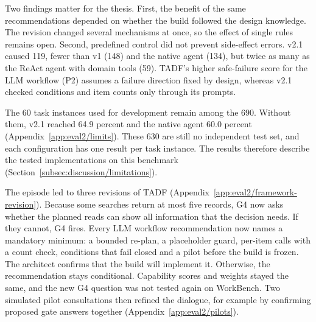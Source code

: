 Two findings matter for the thesis. First, the benefit of the same recommendations depended on whether the build followed the design knowledge. The revision changed several mechanisms at once, so the effect of single rules remains open. Second, predefined control did not prevent side-effect errors. v2.1 caused 119, fewer than v1 (148) and the native agent (134), but twice as many as the ReAct agent with domain tools (59). TADF's higher safe-failure score for the LLM workflow (P2) assumes a failure direction fixed by design, whereas v2.1 checked conditions and item counts only through its prompts.

The 60 task instances used for development remain among the 690. Without them, v2.1 reached 64.9 percent and the native agent 60.0 percent (Appendix~\ref{app:eval2/limits}). These 630 are still no independent test set, and each configuration has one result per task instance. The results therefore describe the tested implementations on this benchmark (Section~\ref{subsec:discussion/limitations}).

The episode led to three revisions of TADF (Appendix~\ref{app:eval2/framework-revision}). Because some searches return at most five records, G4 now asks whether the planned reads can show all information that the decision needs. If they cannot, G4 fires. Every LLM workflow recommendation now names a mandatory minimum: a bounded re-plan, a placeholder guard, per-item calls with a count check, conditions that fail closed and a pilot before the build is frozen. The architect confirms that the build will implement it. Otherwise, the recommendation stays conditional. Capability scores and weights stayed the same, and the new G4 question was not tested again on WorkBench. Two simulated pilot consultations then refined the dialogue, for example by confirming proposed gate answers together (Appendix~\ref{app:eval2/pilots}).